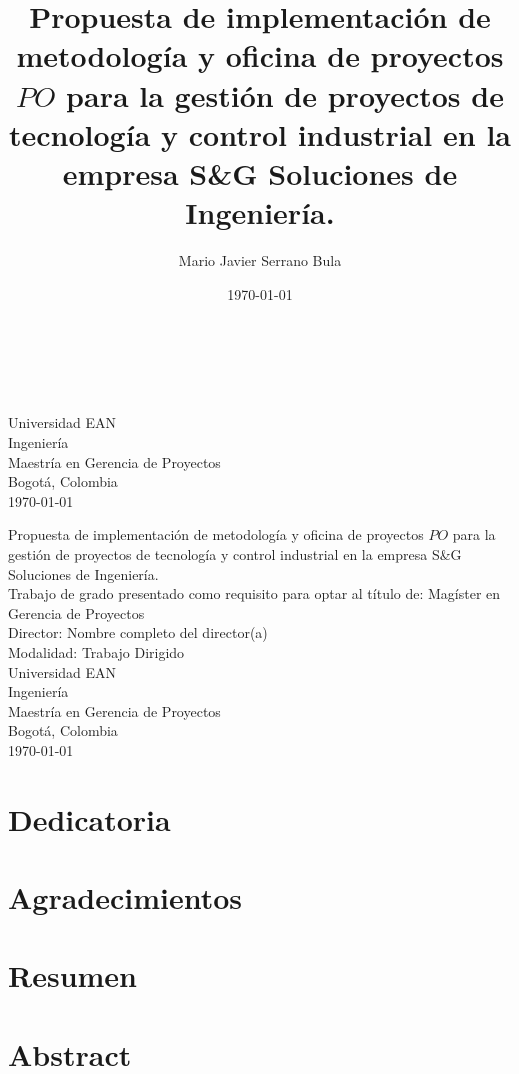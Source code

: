 \documentclass[12pt]{article}
\title{Propuesta de implementación de metodología y oficina de proyectos \(PO\) para la gestión de proyectos de tecnología y control industrial en la empresa S\&G Soluciones de Ingeniería.}
\author{Mario Javier Serrano Bula}
\date{\today}
\newcommand{\mydirector}{Nombre completo del director(a)}
\newcommand{\myuniversity}{Universidad EAN}
\newcommand{\myfaculty}{Ingeniería}
\newcommand{\myprogram}{Maestría en Gerencia de Proyectos}
\newcommand{\mycity}{Bogotá, Colombia}
\newcommand{\mytitle}{Propuesta de implementación de metodología y oficina de proyectos \(PO\) para la gestión de proyectos de tecnología y control industrial en la empresa S\&G Soluciones de Ingeniería.}
\newcommand{\chapterbreak}{\clearpage \thispagestyle{fancy}}
\begin{document}
\begin{titlepage}
\makeatletter
\@title\\[3cm]
\@author\\
\makeatother
\vfill
\begin{flushleft}
\myuniversity\\
\myfaculty\\
\myprogram\\
\mycity\\
\today
\end{flushleft}
\end{titlepage}

\chapterbreak
\begin{center}
\mytitle\\[2cm]
Trabajo de grado presentado como requisito para optar al título de: Magíster en Gerencia de Proyectos\\[2cm]
Director: \mydirector\\[2cm]
Modalidad: Trabajo Dirigido\\[1.5cm]
\vfill
\myuniversity\\
\myfaculty\\
\myprogram\\
\mycity\\
\today
\end{center}

\chapterbreak
\section*{}


\chapterbreak
\section*{Dedicatoria}


\chapterbreak
\section*{Agradecimientos}


\chapterbreak
\section*{Resumen}


\chapterbreak
\section*{Abstract}

\end{document}
